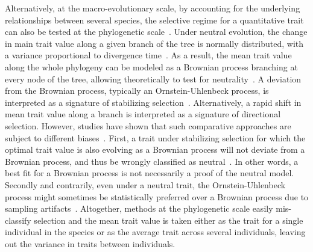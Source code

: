 \documentclass{article}
\begin{document}
Alternatively, at the macro-evolutionary scale, by accounting for the underlying relationships between several species, the selective regime for a quantitative trait can also be tested at the phylogenetic scale~\cite{felsenstein_phylogenies_1985}.
Under neutral evolution, the change in main trait value along a given branch of the tree is normally distributed, with a variance proportional to divergence time~\cite{hansen_translating_1996}.
As a result, the mean trait value along the whole phylogeny can be modeled as a Brownian process branching at every node of the tree, allowing theoretically to test for neutrality~\cite{hansen_translating_1996, harmon_phylogenetic_2018}.
A deviation from the Brownian process, typically an Ornstein-Uhlenbeck process, is interpreted as a signature of stabilizing selection~\cite{catalan_drift_2019}.
Alternatively, a rapid shift in mean trait value along a branch is interpreted as a signature of directional selection.
However, studies have shown that such comparative approaches are subject to different biases~\cite{harmon_phylogenetic_2018}.
First, a trait under stabilizing selection for which the optimal trait value is also evolving as a Brownian process will not deviate from a Brownian process, and thus be wrongly classified as neutral~\cite{hansen_translating_1996}.
In other words, a best fit for a Brownian process is not necessarily a proof of the neutral model.
Secondly and contrarily, even under a neutral trait, the Ornstein-Uhlenbeck process might sometimes be statistically preferred over a Brownian process due to sampling artifacts~\cite{silvestro_measurement_2015, cooper_cautionary_2016, price_detecting_2022}.
Altogether, methods at the phylogenetic scale easily mis-classify selection and the mean trait value is taken either as the trait for a single individual in the species or as the average trait across several individuals, leaving out the variance in traits between individuals.
\end{document}
